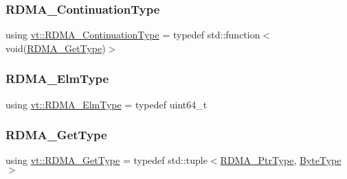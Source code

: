 \mbox{\label{namespacevt_a9880273f1697d78c2171f8d8f044de51}} 
\subsubsection{\texorpdfstring{R\+D\+M\+A\+\_\+\+Continuation\+Type}{RDMA\_ContinuationType}}
{\footnotesize\ttfamily using \hyperlink{namespacevt_a9880273f1697d78c2171f8d8f044de51}{vt\+::\+R\+D\+M\+A\+\_\+\+Continuation\+Type} = typedef std\+::function$<$void(\hyperlink{namespacevt_a1cab7f4860f65a49ad2c042d6240f288}{R\+D\+M\+A\+\_\+\+Get\+Type})$>$}

\mbox{\label{namespacevt_a2c2a902092b72056f70210c159f966f0}} 
\subsubsection{\texorpdfstring{R\+D\+M\+A\+\_\+\+Elm\+Type}{RDMA\_ElmType}}
{\footnotesize\ttfamily using \hyperlink{namespacevt_a2c2a902092b72056f70210c159f966f0}{vt\+::\+R\+D\+M\+A\+\_\+\+Elm\+Type} = typedef uint64\+\_\+t}

\mbox{\label{namespacevt_a1cab7f4860f65a49ad2c042d6240f288}} 
\subsubsection{\texorpdfstring{R\+D\+M\+A\+\_\+\+Get\+Type}{RDMA\_GetType}}
{\footnotesize\ttfamily using \hyperlink{namespacevt_a1cab7f4860f65a49ad2c042d6240f288}{vt\+::\+R\+D\+M\+A\+\_\+\+Get\+Type} = typedef std\+::tuple$<$\hyperlink{namespacevt_a9e2c953286c7616f7c218e9951790776}{R\+D\+M\+A\+\_\+\+Ptr\+Type}, \hyperlink{namespacevt_aab8d55968084610ce3b17057981e9300}{Byte\+Type}$>$}

\mbox{\label{namespacevt_a9530efb893c0f3846e8ac5f0507e0f49}} 
